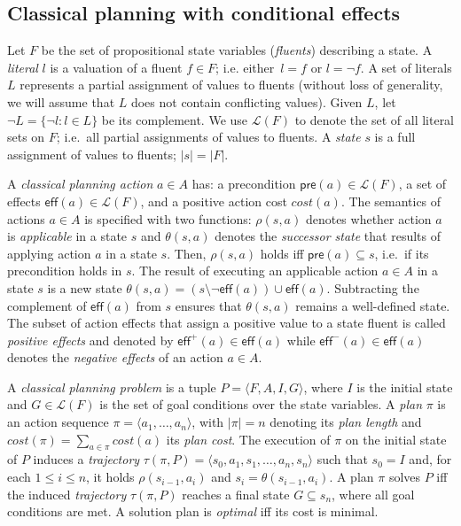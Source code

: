 \documentclass{article}
\newcommand{\tup}[1]{{\langle #1 \rangle}}
\newcommand{\pre}{\mathsf{pre}}     %
\newcommand{\eff}{\mathsf{eff}}     %
\begin{document}
\subsection{Classical planning with conditional effects}
Let $F$ be the set of  propositional state variables ({\em fluents}) describing a state. A {\em literal} $l$ is a valuation of a fluent $f\in F$; i.e. either~$l=f$ or $l=\neg f$. A set of literals $L$ represents a partial assignment of values to fluents (without loss of generality, we will assume that $L$ does not contain conflicting values). Given $L$, let $\neg L=\{\neg l:l\in L\}$ be its complement. We use $\mathcal{L}(F)$ to denote the set of all literal sets on $F$; i.e.~all partial assignments of values to fluents. A {\em state} $s$ is a full assignment of values to fluents; $|s|=|F|$.

A {\em classical planning action} $a\in A$ has: a precondition $\pre(a)\in\mathcal{L}(F)$, a set of effects $\eff(a)\in\mathcal{L}(F)$, and a positive action cost $cost(a)$. The semantics of actions $a\in A$ is specified with two functions: $\rho(s,a)$ denotes whether action $a$ is {\em applicable} in a state $s$ and $\theta(s,a)$ denotes the {\em successor state} that results of applying action $a$ in a state $s$. Then, $\rho(s,a)$ holds iff $\pre(a)\subseteq s$, i.e.~if its precondition holds in $s$. The result of executing an applicable action $a\in A$ in a state $s$ is a new state $\theta(s,a)=(s\setminus \neg\eff(a))\cup\eff(a)$. Subtracting the complement of $\eff(a)$ from $s$ ensures that $\theta(s,a)$ remains a well-defined state. The subset of action effects that assign a positive value to a state fluent is called {\em positive effects} and denoted by $\eff^+(a)\in \eff(a)$ while $\eff^-(a)\in \eff(a)$ denotes the {\em negative effects} of an action $a\in A$.

A {\em classical planning problem} is a tuple $P=\tup{F,A,I,G}$, where $I$ is the initial state and $G\in\mathcal{L}(F)$ is the set of goal conditions over the state variables. A {\em plan} $\pi$ is an action sequence $\pi=\tup{a_1, \ldots, a_n}$, with $|\pi|=n$ denoting its {\em plan length} and $cost(\pi)=\sum_{a\in\pi} cost(a)$ its {\em plan cost}. The execution of $\pi$ on the initial state of $P$ induces a {\em trajectory} $\tau(\pi,P)=\tup{s_0, a_1, s_1, \ldots, a_n, s_n}$ such that $s_0=I$ and, for each {\small $1\leq i\leq n$}, it holds $\rho(s_{i-1},a_i)$ and $s_i=\theta(s_{i-1},a_i)$. A plan $\pi$ solves $P$ iff the induced {\em trajectory} $\tau(\pi,P)$ reaches a final state $G \subseteq s_n$, where all goal conditions are met. A solution plan is {\em optimal} iff its cost is minimal.
\end{document}
